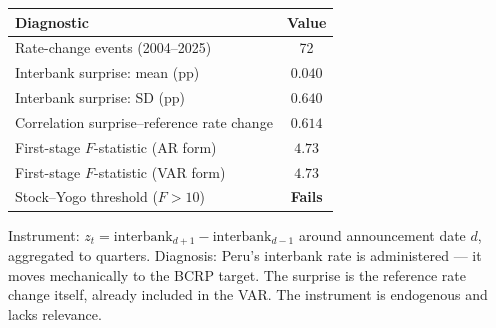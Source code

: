 
\begin{tabular}{lc}
\toprule
Diagnostic & Value \\
\midrule
    Rate-change events (2004--2025) & 72 \\
    Interbank surprise: mean (pp) & $0.040$ \\
    Interbank surprise: SD (pp) & $0.640$ \\
    Correlation surprise--reference rate change & $0.614$ \\
    First-stage $F$-statistic (AR form) & $4.73$ \\
    First-stage $F$-statistic (VAR form) & $4.73$ \\
    Stock--Yogo threshold ($F>10$) & \textbf{Fails} \\
\bottomrule
\end{tabular}
\begin{tablenotes}
\small Instrument: $z_t = \text{interbank}_{d+1} - \text{interbank}_{d-1}$
around announcement date $d$, aggregated to quarters.
Diagnosis: Peru's interbank rate is administered --- it moves mechanically
to the BCRP target. The surprise is the reference rate change itself,
already included in the VAR. The instrument is endogenous and lacks relevance.
\end{tablenotes}
